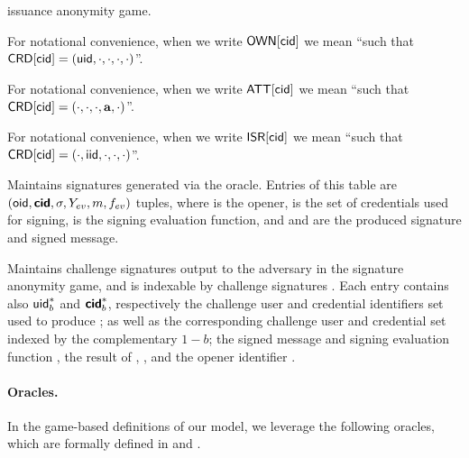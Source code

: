 \begin{description}
  issuance anonymity game.
\item[\OWNR.] For notational convenience, when we write $\mathsf{OWN}[\mathsf{cid}]$ we mean
  ``\uid such that $\mathsf{CRD}[\mathsf{cid}] = (\mathsf{uid}, \cdot, \cdot, \cdot, \cdot)$''.
\item[\ATTR.] For notational convenience, when we write $\mathsf{ATT}[\mathsf{cid}]$ we mean
  ``\attrs such that $\mathsf{CRD}[\mathsf{cid}] = (\cdot, \cdot, \cdot, \mathbf{a}, \cdot)$''.
\item[\ISR.] For notational convenience, when we write $\mathsf{ISR}[\mathsf{cid}]$ we mean
  ``\iid such that $\mathsf{CRD}[\mathsf{cid}] = (\cdot, \mathsf{iid}, \cdot, \cdot, \cdot)$''.
\item[\SIG.] Maintains signatures generated via the \SIGN oracle. Entries of
  this table are $(\mathsf{oid},\boldsymbol{\mathsf{cid}},\sigma,Y_{ev},m,f_{ev})$ tuples, where \oid is
  the opener, \scid is the set of credentials used for
  signing, \feval is the signing evaluation function, and \sig and \msg are the
  produced signature and signed message.
\item[\CSIG.] Maintains challenge signatures output to the adversary in the
  signature anonymity game, and is indexable by challenge signatures \csig.
  Each entry contains also $\mathsf{uid}^*_b$ and $\boldsymbol{\mathsf{cid}}^*_b$, respectively the challenge
  user  and credential identifiers set used to produce \csig; as well as the
  corresponding challenge user and credential set indexed by the complementary
  $1-b$; the signed message \msg and signing evaluation function \feval, the
  result of \feval, \Yeval, and the opener identifier \oid.
\end{description}

\paragraph{Oracles.} %
In the game-based definitions of our \UAS model, we leverage the following
oracles, which are formally defined in  and
. 

